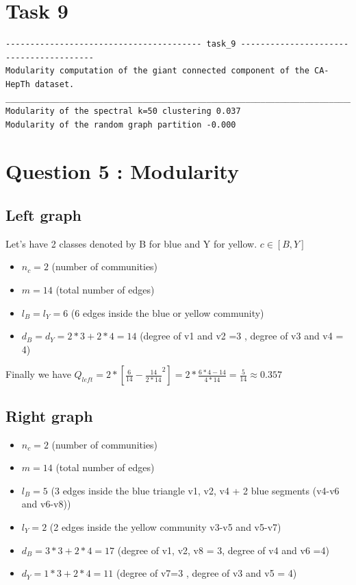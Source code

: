 \documentclass[a4paper]{article}
\begin{document}
\section*{Task 9}
\begin{verbatim}
---------------------------------------- task_9 ----------------------------------------
Modularity computation of the giant connected component of the CA-HepTh dataset.
________________________________________________________________________________________
Modularity of the spectral k=50 clustering 0.037
Modularity of the random graph partition -0.000
\end{verbatim}

\section{Question 5 : Modularity}
\subsection*{Left graph}
Let's have 2 classes denoted by B for blue and Y for yellow. $c \in [B, Y]$
\begin{itemize}
    \item $n_c = 2$ (number of communities)
    \item $m = 14$ (total number of edges)
    \item $l_B = l_Y  = 6$ (6 edges inside the blue or yellow community)
    \item $d_B = d_Y = 2*3 + 2*4 = 14$ (degree of v1 and v2 =3 , degree of v3 and v4 = 4)
\end{itemize}
Finally we have $Q_{left} = 2*\left[ \frac{6}{14} - \frac{14}{2*14}^2 \right]=2*\frac{6*4-14}{4*14}=\frac{5}{14}\approx 0.357$

\subsection*{Right graph}
\begin{itemize}
    \item $n_c = 2$ (number of communities)
    \item $m = 14$ (total number of edges)
    \item $l_B = 5$ (3 edges inside the blue triangle v1, v2, v4 + 2 blue segments (v4-v6 and v6-v8))
    \item $l_Y  = 2$ (2 edges inside the yellow community v3-v5 and v5-v7)
    \item $d_B = 3*3 + 2*4 = 17$ (degree of v1, v2, v8 = 3, degree of v4 and v6 =4)
    \item $d_Y = 1*3 + 2*4 = 11$ (degree of v7=3 , degree of v3 and v5 = 4)
\end{itemize}
\end{document}
